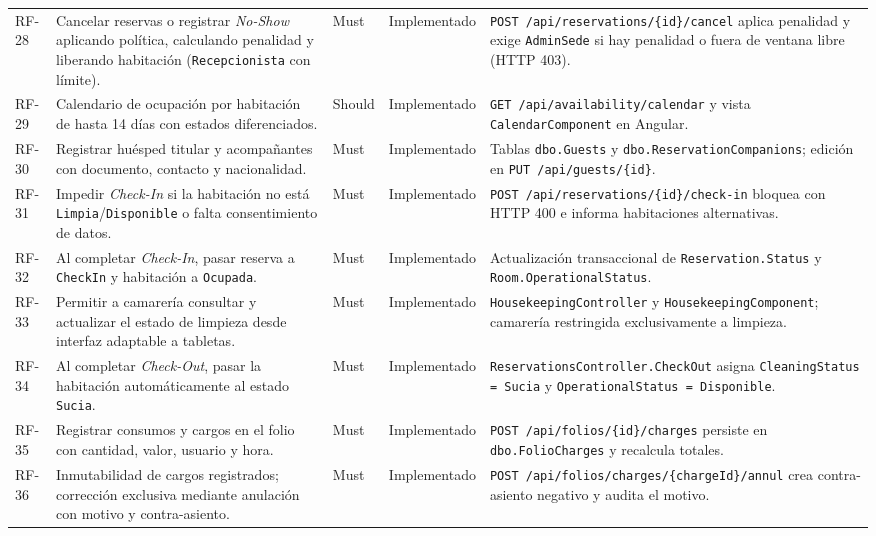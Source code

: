 \documentclass[12pt,a4paper]{article}
\begin{document}
\begin{longtable}{p{1.3cm} p{5.2cm} p{1.3cm} p{2.2cm} p{4.4cm}}
RF-28 & Cancelar reservas o registrar \textit{No-Show} aplicando pol\'itica, calculando penalidad y liberando habitaci\'on (\texttt{Recepcionista} con l\'imite). & Must & Implementado & \texttt{POST /api/reservations/\{id\}/cancel} aplica penalidad y exige \texttt{AdminSede} si hay penalidad o fuera de ventana libre (HTTP 403).\\[0.1cm]
RF-29 & Calendario de ocupaci\'on por habitaci\'on de hasta 14 d\'ias con estados diferenciados. & Should & Implementado & \texttt{GET /api/availability/calendar} y vista \texttt{CalendarComponent} en Angular.\\[0.1cm]
RF-30 & Registrar hu\'esped titular y acompa\~nantes con documento, contacto y nacionalidad. & Must & Implementado & Tablas \texttt{dbo.Guests} y \texttt{dbo.ReservationCompanions}; edici\'on en \texttt{PUT /api/guests/\{id\}}.\\[0.1cm]
RF-31 & Impedir \textit{Check-In} si la habitaci\'on no est\'a \texttt{Limpia}/\texttt{Disponible} o falta consentimiento de datos. & Must & Implementado & \texttt{POST /api/reservations/\{id\}/check-in} bloquea con HTTP 400 e informa habitaciones alternativas.\\[0.1cm]
RF-32 & Al completar \textit{Check-In}, pasar reserva a \texttt{CheckIn} y habitaci\'on a \texttt{Ocupada}. & Must & Implementado & Actualizaci\'on transaccional de \texttt{Reservation.Status} y \texttt{Room.OperationalStatus}.\\[0.1cm]
RF-33 & Permitir a camarer\'ia consultar y actualizar el estado de limpieza desde interfaz adaptable a tabletas. & Must & Implementado & \texttt{HousekeepingController} y \texttt{HousekeepingComponent}; camarer\'ia restringida exclusivamente a limpieza.\\[0.1cm]
RF-34 & Al completar \textit{Check-Out}, pasar la habitaci\'on autom\'aticamente al estado \texttt{Sucia}. & Must & Implementado & \texttt{ReservationsController.CheckOut} asigna \texttt{CleaningStatus = Sucia} y \texttt{OperationalStatus = Disponible}.\\[0.1cm]
RF-35 & Registrar consumos y cargos en el folio con cantidad, valor, usuario y hora. & Must & Implementado & \texttt{POST /api/folios/\{id\}/charges} persiste en \texttt{dbo.FolioCharges} y recalcula totales.\\[0.1cm]
RF-36 & Inmutabilidad de cargos registrados; correcci\'on exclusiva mediante anulaci\'on con motivo y contra-asiento. & Must & Implementado & \texttt{POST /api/folios/charges/\{chargeId\}/annul} crea contra-asiento negativo y audita el motivo.\\[0.1cm]

\end{longtable}
\end{document}
